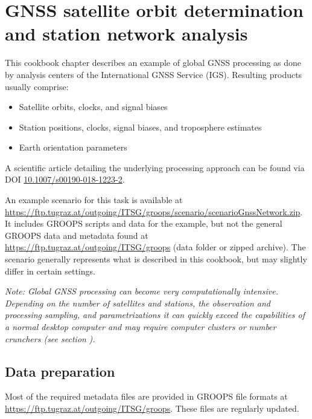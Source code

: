 \section{GNSS satellite orbit determination and station network analysis}\label{cookbook.gnssNetwork}
This cookbook chapter describes an example of global GNSS processing as done by analysis centers of the
International GNSS Service (IGS). Resulting products usually comprise:
\begin{itemize}
  \item Satellite orbits, clocks, and signal biases
  \item Station positions, clocks, signal biases, and troposphere estimates
  \item Earth orientation parameters
\end{itemize}

A scientific article detailing the underlying processing approach
can be found via DOI \href{https://doi.org/10.1007/s00190-018-1223-2}{10.1007/s00190-018-1223-2}.

An example scenario for this task is available at \url{https://ftp.tugraz.at/outgoing/ITSG/groops/scenario/scenarioGnssNetwork.zip}.
It includes GROOPS scripts and data for the example, but not the general GROOPS data and metadata found at \url{https://ftp.tugraz.at/outgoing/ITSG/groops} (data folder or zipped archive).
The scenario generally represents what is described in this cookbook, but may slightly differ in certain settings.

\emph{Note: Global GNSS processing can become very computationally intensive. Depending on the number of satellites
and stations, the observation and processing sampling, and parametrizations it can quickly exceed the capabilities
of a normal desktop computer and may require computer clusters or number crunchers (see section}
\emph{).}

\subsection{Data preparation}\label{cookbook.gnssNetwork:metadata}
Most of the required metadata files are provided in GROOPS file formats at \url{https://ftp.tugraz.at/outgoing/ITSG/groops}.
These files are regularly updated.

